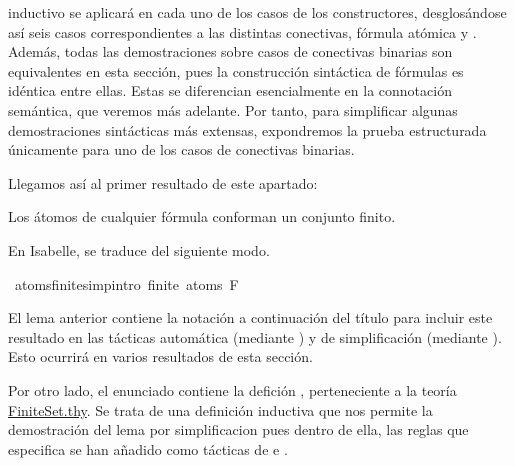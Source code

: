 \begin{isabellebody}
\begin{isamarkuptext}
inductivo se aplicará en cada uno de los casos de los constructores, desglosándose así seis casos 
correspondientes a las distintas conectivas, fórmula atómica y . Además, todas las 
demostraciones sobre casos de conectivas binarias son equivalentes en esta sección, pues la 
construcción sintáctica de fórmulas es idéntica entre ellas. Estas se
diferencian esencialmente en la connotación semántica, que veremos más adelante. Por tanto, para
simplificar algunas demostraciones sintácticas más extensas, expondremos la prueba
estructurada únicamente para uno de los casos de conectivas binarias.%
\end{isamarkuptext}\isamarkuptrue%
%
\begin{isamarkuptext}%
Llegamos así al primer resultado de este apartado:
 \begin{lema}
    Los átomos de cualquier fórmula conforman un conjunto finito.
  \end{lema}%
\end{isamarkuptext}\isamarkuptrue%
%
\begin{isamarkuptext}%
En Isabelle, se traduce del siguiente modo.%
\end{isamarkuptext}\isamarkuptrue%
\isamarkupfalse%
\ atoms{\isacharunderscore}finite{\isacharbrackleft}simp{\isacharcomma}intro{\isacharbang}{\isacharbrackright}{\isacharcolon}\ {\isachardoublequoteopen}finite\ {\isacharparenleft}atoms\ F{\isacharparenright}{\isachardoublequoteclose}\isanewline
%
\isadelimproof
\ \ %
\endisadelimproof
%
\isatagproof
{}\isamarkupfalse%
%
\endisatagproof
{\isafoldproof}%
%
\isadelimproof
%
\endisadelimproof
%
\begin{isamarkuptext}%
El lema anterior contiene la notación  a continuación del título para incluir 
este resultado en las tácticas automática (mediante ) y de simplificación (mediante ). 
Esto ocurrirá en varios resultados de esta sección.%
\end{isamarkuptext}\isamarkuptrue%
%
\begin{isamarkuptext}%
Por otro lado, el enunciado contiene la defición , perteneciente a la teoría 
\href{https://n9.cl/x86r}{FiniteSet.thy}. Se trata de una definición
inductiva que nos permite la demostración del lema por simplificacion pues dentro de ella,
las reglas que especifica se han añadido como tácticas de  e .
\\
\\

\end{isamarkuptext}
\end{isabellebody}
